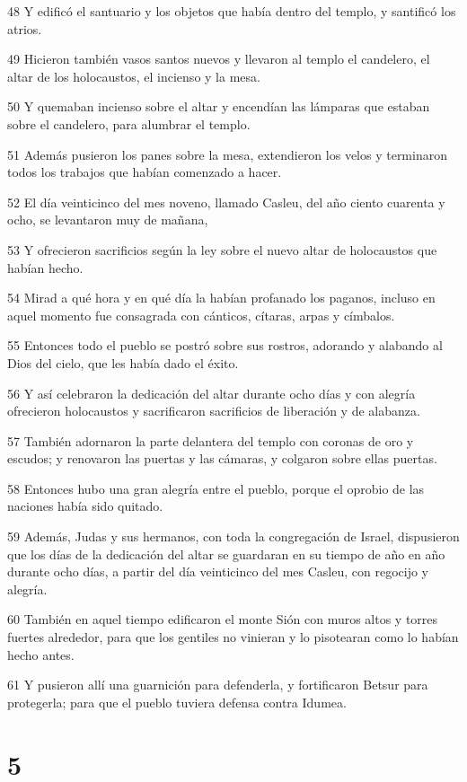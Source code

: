 \par 48 Y edificó el santuario y los objetos que había dentro del templo, y santificó los atrios.
\par 49 Hicieron también vasos santos nuevos y llevaron al templo el candelero, el altar de los holocaustos, el incienso y la mesa.
\par 50 Y quemaban incienso sobre el altar y encendían las lámparas que estaban sobre el candelero, para alumbrar el templo.
\par 51 Además pusieron los panes sobre la mesa, extendieron los velos y terminaron todos los trabajos que habían comenzado a hacer.
\par 52 El día veinticinco del mes noveno, llamado Casleu, del año ciento cuarenta y ocho, se levantaron muy de mañana,
\par 53 Y ofrecieron sacrificios según la ley sobre el nuevo altar de holocaustos que habían hecho.
\par 54 Mirad a qué hora y en qué día la habían profanado los paganos, incluso en aquel momento fue consagrada con cánticos, cítaras, arpas y címbalos.
\par 55 Entonces todo el pueblo se postró sobre sus rostros, adorando y alabando al Dios del cielo, que les había dado el éxito.
\par 56 Y así celebraron la dedicación del altar durante ocho días y con alegría ofrecieron holocaustos y sacrificaron sacrificios de liberación y de alabanza.
\par 57 También adornaron la parte delantera del templo con coronas de oro y escudos; y renovaron las puertas y las cámaras, y colgaron sobre ellas puertas.
\par 58 Entonces hubo una gran alegría entre el pueblo, porque el oprobio de las naciones había sido quitado.
\par 59 Además, Judas y sus hermanos, con toda la congregación de Israel, dispusieron que los días de la dedicación del altar se guardaran en su tiempo de año en año durante ocho días, a partir del día veinticinco del mes Casleu, con regocijo y alegría.
\par 60 También en aquel tiempo edificaron el monte Sión con muros altos y torres fuertes alrededor, para que los gentiles no vinieran y lo pisotearan como lo habían hecho antes.
\par 61 Y pusieron allí una guarnición para defenderla, y fortificaron Betsur para protegerla; para que el pueblo tuviera defensa contra Idumea.

\chapter{5}

